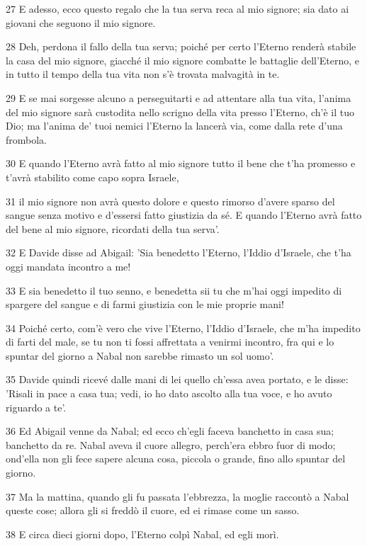 \par 27 E adesso, ecco questo regalo che la tua serva reca al mio signore; sia dato ai giovani che seguono il mio signore.
\par 28 Deh, perdona il fallo della tua serva; poiché per certo l'Eterno renderà stabile la casa del mio signore, giacché il mio signore combatte le battaglie dell'Eterno, e in tutto il tempo della tua vita non s'è trovata malvagità in te.
\par 29 E se mai sorgesse alcuno a perseguitarti e ad attentare alla tua vita, l'anima del mio signore sarà custodita nello scrigno della vita presso l'Eterno, ch'è il tuo Dio; ma l'anima de' tuoi nemici l'Eterno la lancerà via, come dalla rete d'una frombola.
\par 30 E quando l'Eterno avrà fatto al mio signore tutto il bene che t'ha promesso e t'avrà stabilito come capo sopra Israele,
\par 31 il mio signore non avrà questo dolore e questo rimorso d'avere sparso del sangue senza motivo e d'essersi fatto giustizia da sé. E quando l'Eterno avrà fatto del bene al mio signore, ricordati della tua serva'.
\par 32 E Davide disse ad Abigail: 'Sia benedetto l'Eterno, l'Iddio d'Israele, che t'ha oggi mandata incontro a me!
\par 33 E sia benedetto il tuo senno, e benedetta sii tu che m'hai oggi impedito di spargere del sangue e di farmi giustizia con le mie proprie mani!
\par 34 Poiché certo, com'è vero che vive l'Eterno, l'Iddio d'Israele, che m'ha impedito di farti del male, se tu non ti fossi affrettata a venirmi incontro, fra qui e lo spuntar del giorno a Nabal non sarebbe rimasto un sol uomo'.
\par 35 Davide quindi ricevé dalle mani di lei quello ch'essa avea portato, e le disse: 'Risali in pace a casa tua; vedi, io ho dato ascolto alla tua voce, e ho avuto riguardo a te'.
\par 36 Ed Abigail venne da Nabal; ed ecco ch'egli faceva banchetto in casa sua; banchetto da re. Nabal aveva il cuore allegro, perch'era ebbro fuor di modo; ond'ella non gli fece sapere alcuna cosa, piccola o grande, fino allo spuntar del giorno.
\par 37 Ma la mattina, quando gli fu passata l'ebbrezza, la moglie raccontò a Nabal queste cose; allora gli si freddò il cuore, ed ei rimase come un sasso.
\par 38 E circa dieci giorni dopo, l'Eterno colpì Nabal, ed egli morì.
